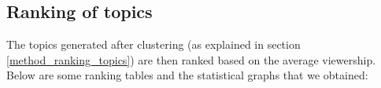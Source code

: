 \documentclass{article}
\begin{document}
\subsection{Ranking of topics}
\label{topics_ranking}

\noindent The topics generated after clustering (as explained in section \ref{method_ranking_topics}) are then ranked based on the average viewership. Below are some ranking tables and the statistical graphs that we obtained:
\end{document}
